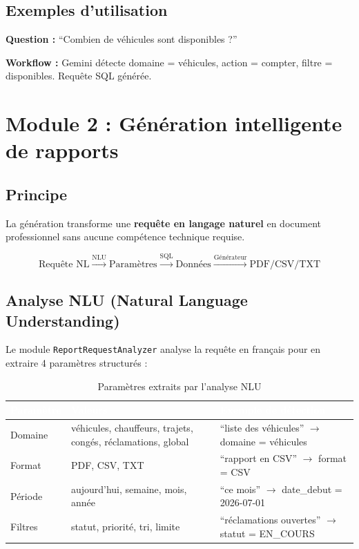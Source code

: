 \documentclass[12pt,a4paper]{report}
\newcommand{\thead}[1]{\cellcolor{tablehead}\textcolor{white}{\textbf{#1}}}
\begin{document}
\subsection{Exemples d'utilisation}

\begin{tcolorbox}[ruleframe]
\textbf{Question :} ``Combien de véhicules sont disponibles ?''

\textbf{Workflow :}
Gemini détecte domaine = véhicules, action = compter, filtre = disponibles.
Requête SQL générée.
\end{tcolorbox}

\section{Module 2 : Génération intelligente de rapports}
\label{sec:ch7-module2}

\subsection{Principe}

La génération transforme une \textbf{requête en langage naturel} en document
professionnel sans aucune compétence technique requise.

\[
  \text{Requête NL} \xrightarrow{\text{NLU}} \text{Paramètres}
  \xrightarrow{\text{SQL}} \text{Données}
  \xrightarrow{\text{Générateur}} \text{PDF/CSV/TXT}
\]

\subsection{Analyse NLU (Natural Language Understanding)}

Le module \texttt{ReportRequestAnalyzer} analyse la requête en français pour
en extraire 4 paramètres structurés :

\begin{table}[H]
  \centering
  \caption{Paramètres extraits par l'analyse NLU}
  \label{tab:nlu}
  \begin{tabularx}{\textwidth}{|p{}|p{}|X|}
    \hline
    \thead{Paramètre} & \thead{Valeurs} & \thead{Exemple de détection} \\
    \hline
    Domaine &
      véhicules, chauffeurs, trajets, congés, réclamations, global &
      ``liste des véhicules'' $\rightarrow$ domaine = véhicules \\
    \hline
    Format &
      PDF, CSV, TXT &
      ``rapport en CSV'' $\rightarrow$ format = CSV \\
    \hline
    Période &
      aujourd'hui, semaine, mois, année &
      ``ce mois'' $\rightarrow$ date\_debut = 2026-07-01 \\
    \hline
    Filtres &
      statut, priorité, tri, limite &
      ``réclamations ouvertes'' $\rightarrow$ statut = EN\_COURS \\
    \hline
  \end{tabularx}
\end{table}
\end{document}

